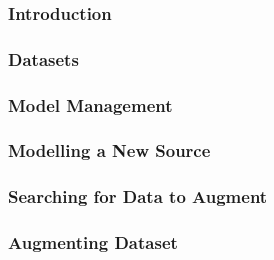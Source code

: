 \documentclass[runningheads,a4paper]{llncs}
\begin{document}
\subsubsection*{Introduction} 


\subsubsection*{Datasets}


\subsubsection*{Model Management} 


\subsubsection*{Modelling a New Source} 


\subsubsection*{Searching for Data to Augment} 


\subsubsection*{Augmenting Dataset} 




\end{document}

